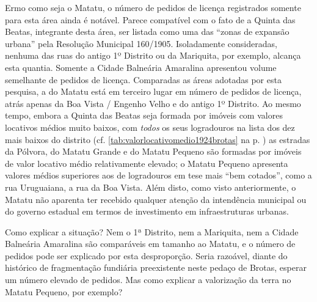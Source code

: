 Ermo como seja o Matatu, o número de pedidos de licença registrados somente para esta área ainda é notável. Parece compatível com o fato de a Quinta das Beatas, integrante desta área, ser listada como uma das ``zonas de expansão urbana'' pela Resolução Municipal 160/1905. Isoladamente consideradas, nenhuma das ruas do antigo 1º Distrito ou da Mariquita, por exemplo, alcança esta quantia. Somente a Cidade Balneária Amaralina apresentou volume semelhante de pedidos de licença. Comparadas as áreas adotadas por esta pesquisa, a do Matatu está em terceiro lugar em número de pedidos de licença, atrás apenas da Boa Vista / Engenho Velho e do antigo 1º Distrito. Ao mesmo tempo, embora a Quinta das Beatas seja formada por imóveis com valores locativos médios muito baixos, com \textit{todos} os seus logradouros na lista dos dez mais baixos do distrito (cf. \autoref{tab:valorlocativomedio1924brotas} na p. \pageref{tab:valorlocativomedio1924brotas}) as estradas da Pólvora, do Matatu Grande e do Matatu Pequeno são formadas por imóveis de valor locativo médio relativamente elevado; o Matatu Pequeno apresenta valores médios superiores aos de logradouros em tese mais ``bem cotados'', como a rua Uruguaiana, a rua da Boa Vista. Além disto, como visto anteriormente, o Matatu não aparenta ter recebido qualquer atenção da intendência municipal ou do governo estadual em termos de investimento em infraestruturas urbanas.

Como explicar a situação? Nem o 1ª Distrito, nem a Mariquita, nem a Cidade Balneária Amaralina são comparáveis em tamanho ao Matatu, e o número de pedidos pode ser explicado por esta desproporção. Seria razoável, diante do histórico de fragmentação fundiária preexistente neste pedaço de Brotas, esperar um número elevado de pedidos. Mas como explicar a valorização da terra no Matatu Pequeno, por exemplo? 


